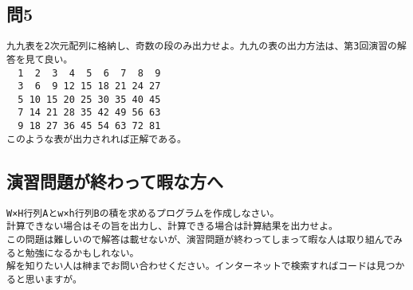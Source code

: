 \subsection{問5}
\begin{verbatim}
九九表を2次元配列に格納し、奇数の段のみ出力せよ。九九の表の出力方法は、第3回演習の解答を見て良い。
  1  2  3  4  5  6  7  8  9
  3  6  9 12 15 18 21 24 27
  5 10 15 20 25 30 35 40 45
  7 14 21 28 35 42 49 56 63
  9 18 27 36 45 54 63 72 81
このような表が出力されれば正解である。
\end{verbatim}

\subsection{演習問題が終わって暇な方へ}
\begin{verbatim}
W×H行列Aとw×h行列Bの積を求めるプログラムを作成しなさい。
計算できない場合はその旨を出力し、計算できる場合は計算結果を出力せよ。
この問題は難しいので解答は載せないが、演習問題が終わってしまって暇な人は取り組んでみると勉強になるかもしれない。
解を知りたい人は榊までお問い合わせください。インターネットで検索すればコードは見つかると思いますが。
\end{verbatim}
